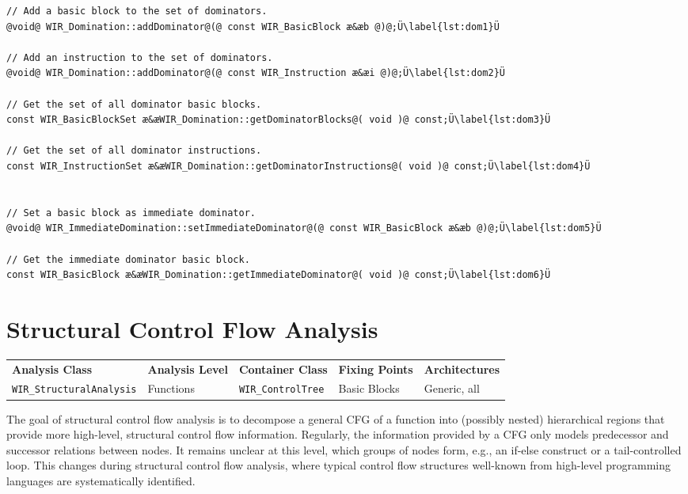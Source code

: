 \begin{lstlisting}[style=code,float=ht,caption={Domination Handling of Container Classes \texttt{WIR\_Domination} and \texttt{WIR\_ImmediateDomination}},label=lst:dom]
// Add a basic block to the set of dominators.
@void@ WIR_Domination::addDominator@(@ const WIR_BasicBlock æ&æb @)@;Ü\label{lst:dom1}Ü

// Add an instruction to the set of dominators.
@void@ WIR_Domination::addDominator@(@ const WIR_Instruction æ&æi @)@;Ü\label{lst:dom2}Ü

// Get the set of all dominator basic blocks.
const WIR_BasicBlockSet æ&æWIR_Domination::getDominatorBlocks@( void )@ const;Ü\label{lst:dom3}Ü

// Get the set of all dominator instructions.
const WIR_InstructionSet æ&æWIR_Domination::getDominatorInstructions@( void )@ const;Ü\label{lst:dom4}Ü


// Set a basic block as immediate dominator.
@void@ WIR_ImmediateDomination::setImmediateDominator@(@ const WIR_BasicBlock æ&æb @)@;Ü\label{lst:dom5}Ü

// Get the immediate dominator basic block.
const WIR_BasicBlock æ&æWIR_Domination::getImmediateDominator@( void )@ const;Ü\label{lst:dom6}Ü
\end{lstlisting}


\section{Structural Control Flow Analysis}
\label{sec:structcflow}

\begin{tabular}{|l|l|l|l|l|}
  \hline
  \textbf{Analysis Class} & \textbf{Analysis Level} & \textbf{Container Class} & \textbf{Fixing Points} & \textbf{Architectures} \\
  \hhline{|=|=|=|=|=|}
  \texttt{\small WIR\_StructuralAnalysis} & Functions & \texttt{\small WIR\_ControlTree} & Basic Blocks & Generic, all \\
  \hline
\end{tabular}

The goal of structural control flow analysis is to decompose a general \gls{CFG} of a function into (possibly nested) hierarchical regions that provide more high-level, structural control flow information.
Regularly, the information provided by a \gls{CFG} only models predecessor and successor relations between nodes.
It remains unclear at this level, which groups of nodes form, e.g., an if-else construct or a tail-controlled loop.
This changes during structural control flow analysis, where typical control flow structures well-known from high-level programming languages are systematically identified.

